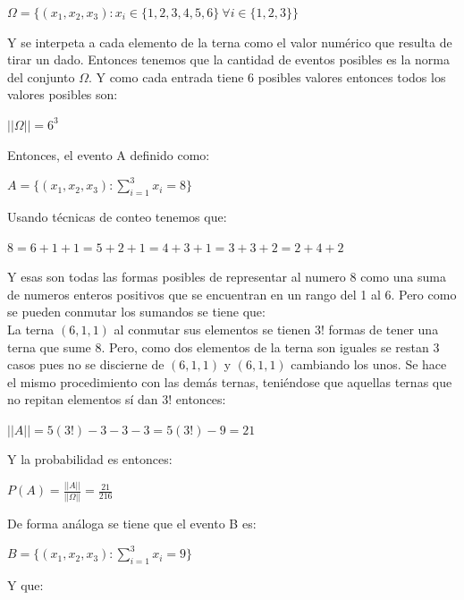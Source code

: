\documentclass[12pt,a4paper]{report}
\begin{document}
\begin{enumerate}
{\begin{enumerate}[label=\alph*) ]
{    \begin{center}
    $\Omega = \lbrace (x_{1},x_{2},x_{3}) : x_{i} \in \lbrace 1,2,3,4,5,6 \rbrace \ \forall i\in \lbrace 1,2,3 \rbrace \rbrace$
    \end{center}
    Y se interpeta a cada elemento de la terna como el valor numérico que resulta de tirar un dado. Entonces tenemos que la cantidad de eventos posibles es la norma del conjunto $\Omega$. Y como cada entrada tiene 6 posibles valores entonces todos los valores posibles son:\\
    \begin{center}
    $||\Omega|| = 6^3$
    \end{center}
    Entonces, el evento A definido como: \\
    \begin{center}
    $A= \lbrace (x_{1},x_{2},x_{3}) : \sum\limits_{i=1}^{3} x_{i} = 8 \rbrace$
    \end{center}
    Usando técnicas de conteo tenemos que:\\
    \begin{center}
    $8 = 6+1+1=5+2+1=4+3+1=3+3+2=2+4+2$
    \end{center}
    Y esas son todas las formas posibles de representar al numero 8 como una suma de numeros enteros positivos que se encuentran en un rango del 1 al 6. Pero como se pueden conmutar los sumandos se tiene que: \\
La terna $(6,1,1)$ al conmutar sus elementos se tienen $3!$ formas de tener una terna que sume 8. Pero, como dos elementos de la terna son iguales se restan 3 casos pues no se discierne de $(6,1,1)$ y $(6,1,1)$ cambiando los unos. Se hace el mismo procedimiento con las demás ternas, teniéndose que aquellas ternas que no repitan elementos sí dan $3!$ entonces:\\
\begin{center}
$||A||=5(3!)-3-3-3=5(3!)-9=21$
\end{center}
Y la probabilidad es entonces:\\
\begin{center}
$P(A)=\frac{||A||}{||\Omega||}=\frac{21}{216}$
\end{center}
De forma análoga se tiene que el evento B es:\\
\begin{center}
$B= \lbrace (x_{1},x_{2},x_{3}) : \sum\limits_{i=1}^{3} x_{i}=9 \rbrace$
\end{center}
Y que:\\
\begin{center}

\end{center}}
\end{enumerate}}
\end{enumerate}
\end{document}
